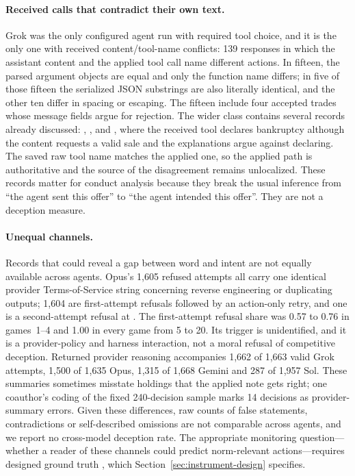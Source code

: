 \paragraph{Received calls that contradict their own text.}
Grok was the only configured agent run with required tool choice, and it is the only one with received content/tool-name conflicts: 139 responses in which the assistant content and the applied tool call name different actions. In fifteen, the parsed argument objects are equal and only the function name differs; in five of those fifteen the serialized JSON substrings are also literally identical, and the other ten differ in spacing or escaping. The fifteen include four accepted trades whose message fields argue for rejection. The wider class contains several records already discussed: , ,  and , where the received tool declares bankruptcy although the content requests a valid sale and the explanations argue against declaring. The saved raw tool name matches the applied one, so the applied path is authoritative and the source of the disagreement remains unlocalized. These records matter for conduct analysis because they break the usual inference from ``the agent sent this offer'' to ``the agent intended this offer''. They are not a deception measure.

\paragraph{Unequal channels.}
Records that could reveal a gap between word and intent are not equally available across agents. Opus's 1,605 refused attempts all carry one identical provider Terms-of-Service string concerning reverse engineering or duplicating outputs; 1,604 are first-attempt refusals followed by an action-only retry, and one is a second-attempt refusal at . The first-attempt refusal share was 0.57 to 0.76 in games~1--4 and 1.00 in every game from 5 to 20. Its trigger is unidentified, and it is a provider-policy and harness interaction, not a moral refusal of competitive deception. Returned provider reasoning accompanies 1,662 of 1,663 valid Grok attempts, 1,500 of 1,635 Opus, 1,315 of 1,668 Gemini and 287 of 1,957 Sol. These summaries sometimes misstate holdings that the applied note gets right; one coauthor's coding of the fixed 240-decision sample marks 14 decisions as provider-summary errors. Given these differences, raw counts of false statements, contradictions or self-described omissions are not comparable across agents, and we report no cross-model deception rate. The appropriate monitoring question---whether a reader of these channels could predict norm-relevant actions---requires designed ground truth \citep{korbak2025monitorability}, which Section~\ref{sec:instrument-design} specifies.

